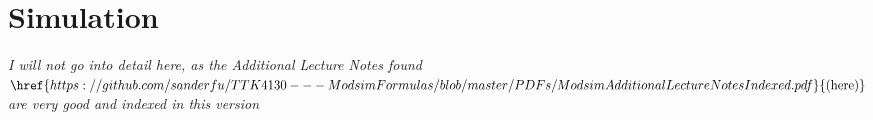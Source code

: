 \part{Simulation}
\textit{I will not go into detail here, as the Additional Lecture Notes found $\href{https://github.com/sanderfu/TTK4130---ModsimFormulas/blob/master/PDFs/ModsimAdditionalLectureNotesIndexed.pdf}{\text{(here)}}$ are very good and indexed in this version} 
